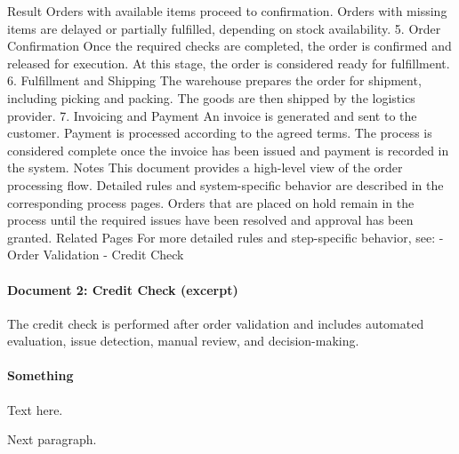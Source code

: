 Result
Orders with available items proceed to confirmation.
Orders with missing items are delayed or partially fulfilled, depending on stock availability.
5. Order Confirmation
Once the required checks are completed, the order is confirmed and released for execution.
At this stage, the order is considered ready for fulfillment.
6. Fulfillment and Shipping
The warehouse prepares the order for shipment, including picking and packing.
The goods are then shipped by the logistics provider.
7. Invoicing and Payment
An invoice is generated and sent to the customer.
Payment is processed according to the agreed terms.
The process is considered complete once the invoice has been issued and payment is recorded in the system.
Notes
This document provides a high-level view of the order processing flow.
Detailed rules and system-specific behavior are described in the corresponding process pages.
Orders that are placed on hold remain in the process until the required issues have been resolved and approval has been granted.
Related Pages
For more detailed rules and step-specific behavior, see:
- Order Validation
- Credit Check

\paragraph{Document 2: Credit Check (excerpt)}

The credit check is performed after order validation and includes automated evaluation, 
issue detection, manual review, and decision-making.

\paragraph{Something}\par
Text here.

Next paragraph.